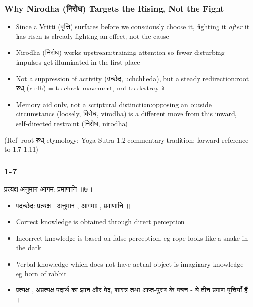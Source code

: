 \begin{frame}[fragile]\frametitle{Why Nirodha (निरोध) Targets the Rising, Not the Fight}

\begin{itemize}
\item Since a Vritti (वृत्ति) surfaces before we consciously choose it, fighting it \emph{after} it has risen is already fighting an effect, not the cause
\item Nirodha (निरोध) works upstream:training attention so fewer disturbing impulses get illuminated in the first place
\item Not a suppression of activity (उच्छेद, uchchheda), but a steady redirection:root रुध् (rudh) = to check movement, not to destroy it
\item Memory aid only, not a scriptural distinction:opposing an outside circumstance (loosely, विरोध, virodha) is a different move from this inward, self-directed restraint (निरोध, nirodha)
\end{itemize}

\tiny{(Ref: root रुध् etymology; Yoga Sutra 1.2 commentary tradition; forward-reference to 1.7-1.11)}

\end{frame}

\begin{frame}[fragile]\frametitle{1-7}

\begin{sanskrit}
प्रत्यक्ष अनुमान आगम: प्रमाणानि ॥७॥
\end{sanskrit}


\begin{itemize}
\item पदच्छेद: प्रत्यक्ष , अनुमान , आगमाः , प्रमाणानि ॥
\item Correct knowledge is obtained through direct perception
\item Incorrect knowledge is based on false perception, eg rope looks like a snake in the dark
\item Verbal knowledge which does not have actual object is imaginary knowledge eg horn of rabbit
\item प्रत्यक्ष , अप्रत्यक्ष पदार्थ का ज्ञान और वेद, शास्त्र तथा आप्त-पुरुष के वचन - ये तीन प्रमाण वृत्तियाँ हैं ।	
\end{itemize}

\end{frame}


